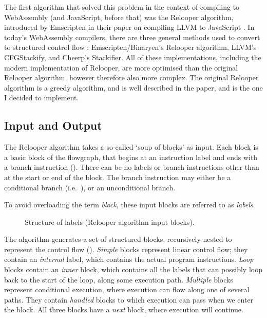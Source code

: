 \documentclass[00-main.tex]{subfiles}
\begin{document}
The first algorithm that solved this problem in the context of compiling to WebAssembly (and JavaScript, before that) was the Relooper algorithm, introduced by Emscripten in their paper on compiling LLVM to JavaScript .
In today's WebAssembly compilers, there are three general methods used to convert to structured control flow : Emscripten/Binaryen's Relooper algorithm, LLVM's CFGStackify, and Cheerp's Stackifier.
All of these implementations, including the modern implementation of Relooper, are more optimised than the original Relooper algorithm, however therefore also more complex.
The original Relooper algorithm is a greedy algorithm, and is well described in the paper, and is the one I decided to implement.

\subsection{Input and Output}

The Relooper algorithm takes a so-called `soup of blocks' as input.
Each block is a basic block of the flowgraph, that begins at an instruction label and ends with a branch instruction ().
There can be no labels or branch instructions other than at the start or end of the block.
The branch instruction may either be a conditional branch (i.e.\ ), or an unconditional branch.

To avoid overloading the term \emph{block}, these input blocks are referred to as \emph{labels}.


\begin{figure}[ht]
  \centering
  \caption{Structure of labels (Relooper algorithm input blocks).}
  \label{fig:relooper input label structure} %
\end{figure}

The algorithm generates a set of structured blocks, recursively nested to represent the control flow ().
\emph{Simple} blocks represent linear control flow; they contain an \emph{internal} label, which contains the actual program instructions.
\emph{Loop} blocks contain an \emph{inner} block, which contains all the labels that can possibly loop back to the start of the loop, along some execution path.
\emph{Multiple} blocks represent conditional execution, where execution can flow along one of several paths.
They contain \emph{handled} blocks to which execution can pass when we enter the block.
All three blocks have a \emph{next} block, where execution will continue.
\end{document}
